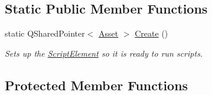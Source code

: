 \subsection*{Static Public Member Functions}
\begin{DoxyCompactItemize}
\item 
static Q\-Shared\-Pointer$<$ \hyperlink{class_picto_1_1_asset}{Asset} $>$ \hyperlink{class_picto_1_1_script_element_a9c83fda35febde0e98a5ff19ed8a9bd0}{Create} ()
\begin{DoxyCompactList}\small\item\em Sets up the \hyperlink{class_picto_1_1_script_element}{Script\-Element} so it is ready to run scripts. \end{DoxyCompactList}\end{DoxyCompactItemize}
\subsection*{Protected Member Functions}
